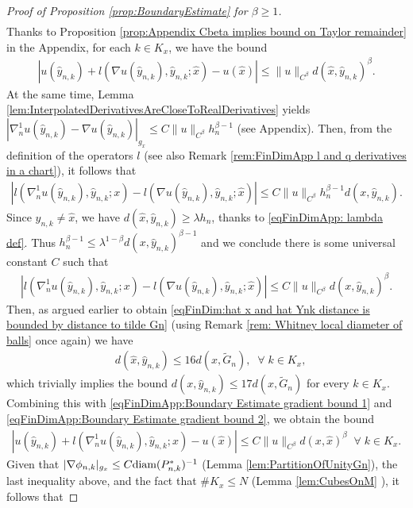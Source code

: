 \documentclass[11pt,reqno]{amsart}
\numberwithin{equation}{section}
\theoremstyle{plain}
\def\diam{\textnormal{diam}}
\begin{document}
\begin{proof}[Proof of Proposition \ref{prop:BoundaryEstimate} for $\beta\geq 1$]
\begin{align*}
    \end{align*}			
    Thanks to Proposition \ref{prop:Appendix Cbeta implies bound on Taylor remainder} in the Appendix, for each $k\in K_x$, we have the bound
    \begin{align}		
      |u(\hat y_{n,k})+l(\nabla u(\hat y_{n,k}),\hat y_{n,k};\hat x)-u(\hat x)|\leq \|u\|_{C^\beta}d(\hat x,\hat y_{n,k})^\beta.	\label{eqFinDimApp:Boundary Estimate gradient bound 1}
    \end{align}	
    At the same time, Lemma \ref{lem:InterpolatedDerivativesAreCloseToRealDerivatives}  yields $|\nabla^1_n u(\hat y_{n,k})-\nabla u(\hat y_{n,k})|_{g_x}\leq C\|u\|_{C^\beta} h_n^{\beta-1}$ (see Appendix). Then,  from the definition of the operators $l$ (see also Remark \ref{rem:FinDimApp l and q derivatives in a chart}), it follows that
    \begin{align*}	
      |l(\nabla^1_nu(\hat y_{n,k}),\hat y_{n,k};x)-l(\nabla u(\hat y_{n,k}),\hat y_{n,k};\hat x)| \leq C\|u\|_{C^\beta}h_n^{\beta-1}d(x,\hat y_{n,k}). 
    \end{align*}	
    Since $\hat y_{n,k}\neq \hat x$, we have $d(\hat x,\hat y_{n,k}) \geq \lambda h_n$, thanks to \eqref{eqFinDimApp: lambda def}. Thus $h_n^{\beta-1} \leq \lambda^{1-\beta}d(x,\hat y_{n,k})^{\beta-1}$ and we conclude there is some universal constant $C$ such that
    \begin{align}	
      |l(\nabla^1_nu(\hat y_{n,k}),\hat y_{n,k};x)-l(\nabla u(\hat y_{n,k}),\hat y_{n,k};\hat x)| \leq C\|u\|_{C^\beta}d(x,\hat y_{n,k})^{\beta}.\label{eqFinDimApp:Boundary Estimate gradient bound 2}
    \end{align}		
   Then, as argued earlier to obtain \eqref{eqFinDim:hat x and hat Ynk distance is bounded by distance to tilde Gn} (using Remark \ref{rem: Whitney local diameter of balls} once again)  we have 
   \begin{align*}
     & d(\hat x,\hat y_{n,k})\leq 16d(x,\tilde G_n),\;\;\forall\;k\in K_x,
   \end{align*}
   which trivially implies the bound $d(x,\hat y_{n,k})\leq 17d(x,\tilde G_n)$ for every $k\in K_x$. Combining this with \eqref{eqFinDimApp:Boundary Estimate gradient bound 1} and \eqref{eqFinDimApp:Boundary Estimate gradient bound 2}, we obtain the bound
    \begin{align*}
      |u(\hat y_{n,k})+l(\nabla^1_nu(\hat y_{n,k}),\hat y_{n,k};x)-u(\hat x)| \leq C\|u\|_{C^\beta}d(x,\hat x)^\beta \;\;\forall\;k\in K_x.
    \end{align*}			
    Given that $|\nabla \phi_{n,k}|_{g_x}\leq C\diam(P_{n,k}^*)^{-1}$ (Lemma \ref{lem:PartitionOfUnityGn}), the last inequality above, and the fact that $\#K_x \leq N$ (Lemma \ref{lem:CubesOnM} ), it follows that

\end{proof}
\end{document}
